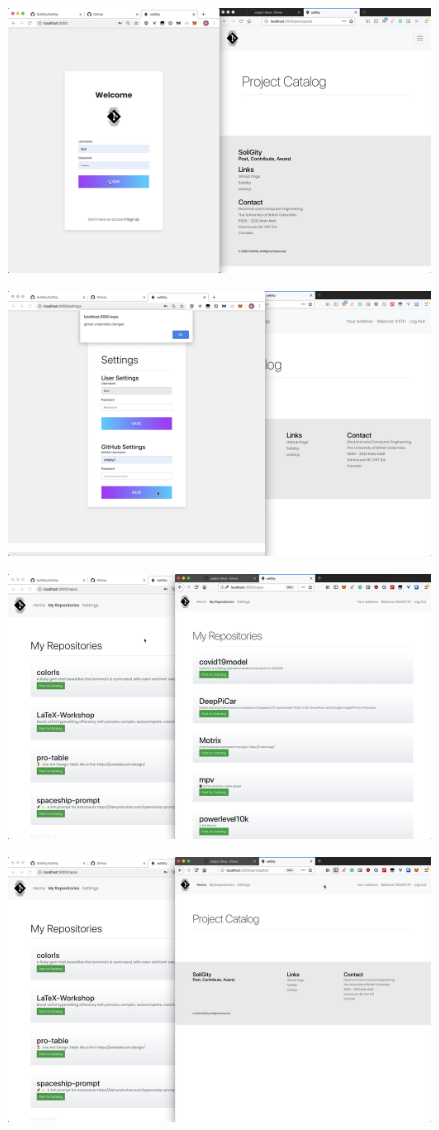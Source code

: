 \documentclass[12pt]{article}
\renewcommand{\_}{\kern-1.5pt\textunderscore\kern-1.5pt}
\begin{document}
\includegraphics[height=7cm]{graphs/19. bob_login}

\includegraphics[height=7cm]{graphs/20. bob_gitub_setup}

\includegraphics[height=7cm]{graphs/21. alice_bob_repos}

\includegraphics[height=7cm]{graphs/22. empty_project_catalog}
\end{document}
